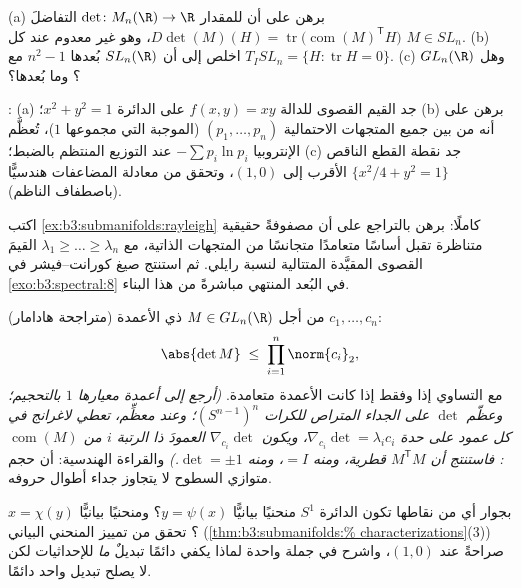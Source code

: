 \begin{exercise}[$\star\star$]\label{exo:b3:submanifolds:6}
(a) برهن على أن للمقدار $\det \colon M_n(\R) \to \R$ التفاضلَ $D\det(M)(H) = \operatorname{tr}\bigl(\operatorname{com}(M)
^{\mathsf T}H\bigr)$، وهو غير معدوم
عند كل $M \in SL_n$.
(b) اخلص إلى أن $SL_n(\R)$  بُعدها $n^2 - 1$ مع
$T_ISL_n = \{H : \operatorname{tr}H = 0\}$.
(c) وهل $GL_n(\R)$ ؟ وما بُعدها؟
\end{exercise}

\begin{exercise}[$\star\star$]\label{exo:b3:submanifolds:7}
:
(a) جد القيم القصوى للدالة $f(x,y) = xy$ على الدائرة $x^2 +
y^2 = 1$؛
(b) برهن على أنه من بين جميع المتجهات الاحتمالية $(p_1, \dots,
p_n)$
(الموجبة التي مجموعها $1$)، تُعظَّم الإنتروبيا $-\sum
p_i\ln p_i$ عند
التوزيع المنتظم بالضبط؛
(c) جد نقطة القطع الناقص $\{x^2/4 + y^2 = 1\}$ الأقرب إلى $(1, 0)$، وتحقق من
معادلة المضاعفات هندسيًّا (باصطفاف الناظم).
\end{exercise}

\begin{exercise}[$\star\star\star$]\label{exo:b3:submanifolds:8}
اكتب \cref{ex:b3:submanifolds:rayleigh} كاملًا: برهن بالتراجع على أن مصفوفةً حقيقية
متناظرة تقبل أساسًا متعامدًا متجانسًا من المتجهات الذاتية، مع
$\lambda_1 \geq \dots \geq \lambda_n$ القيمَ القصوى المقيَّدة المتتالية لنسبة رايلي. ثم
استنتج صيغ كورانت--فيشر في \cref{exo:b3:spectral:8} في البُعد المنتهي
مباشرةً من هذا البناء.
\end{exercise}

\begin{exercise}[$\star\star\star$]\label{exo:b3:submanifolds:9}
(متراجحة هادامار) من أجل $M \in GL_n(\R)$ ذي الأعمدة $c_1, \dots, c_n$:
\[
\abs{\det M} \;\leq\; \prod_{i=1}^n\norm{c_i}_2 ,
\]
مع التساوي إذا وفقط إذا كانت الأعمدة متعامدة. \emph{(أرجع إلى
أعمدة معيارها $1$ بالتحجيم؛ وعظّم $\det$ على الجداء المتراص
للكرات $(S^{n-1})^n$؛ وعند معظِّم، تعطي لاغرانج في كل عمود على
حدة $\nabla_{c_i}\det =
\lambda_ic_i$، ويكون $\nabla_{c_i}\det$ العمودَ ذا الرتبة $i$ من $\operatorname{com}(M)$:
فاستنتج أن $M^{\mathsf T}M$ قطرية، ومنه $= I$، ومنه
$\det = \pm1$.)} والقراءة الهندسية: أن حجم متوازي السطوح لا
يتجاوز جداء أطوال حروفه.
\end{exercise}

\begin{exercise}[$\star\star$]\label{exo:b3:submanifolds:10}
بجوار أي من نقاطها تكون الدائرة $S^1$ منحنيًا بيانيًّا $y =
\psi(x)$؟
ومنحنيًا بيانيًّا $x = \chi(y)$؟ تحقق من تمييز المنحني البياني
(\cref{thm:b3:submanifolds:%
characterizations}(3)) صراحةً عند $(1, 0)$، واشرح في جملة واحدة لماذا
يكفي دائمًا تبديلٌ \emph{ما} للإحداثيات لكن لا يصلح تبديل واحد
دائمًا.
\end{exercise}

